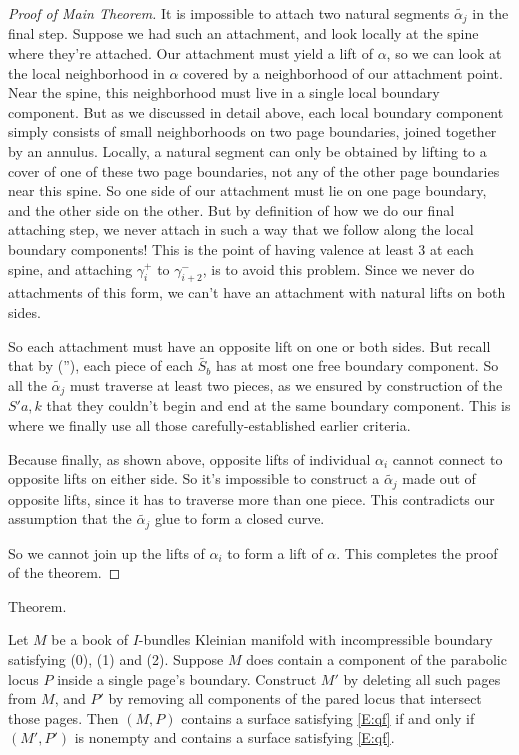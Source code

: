 \documentclass[12pt]{amsart}
\theoremstyle{definition}
\theoremstyle{remark}
\begin{document}
\begin{proof}[Proof of Main Theorem]
It is impossible to attach two natural segments $\widetilde{\alpha_j}$ in the final
step.  Suppose we had such an attachment, and look locally at the spine where
they're attached. Our attachment must yield a lift of $\alpha$, so we can look
at the local neighborhood in $\alpha$ covered by a neighborhood of our
attachment point.  Near the spine, this neighborhood must live in a single
local boundary component. But as we discussed in detail above, each local
boundary component simply consists of small neighborhoods on two page
boundaries, joined together by an annulus. Locally, a natural segment can only
be obtained by lifting to a cover of one of these two page boundaries, not any
of the other page boundaries near this spine. So one side of our attachment
must lie on one page boundary, and the other side on the other. But by
definition of how we do our final attaching step, we never attach in such a way
that we follow along the local boundary components! This is the point of having
valence at least 3 at each spine, and attaching $\gamma_i^+$ to
$\gamma_{i+2}^-$, is to avoid this problem. Since we never do attachments of
this form, we can't have an attachment with natural lifts on both sides.

So each attachment must have an opposite lift on one or both sides. But recall
that by (\dag''), each piece of each $\widetilde{S_b}$ has at most one free boundary
component. So all the $\widetilde{\alpha_j}$ must traverse at least two pieces, as we
ensured by construction of the $S'a,k$ that they couldn't begin and end at the
same boundary component. This is where we finally use all those
carefully-established earlier criteria.

Because finally, as shown above, opposite lifts of individual $\alpha_i$ cannot
connect to opposite lifts on either side. So it's impossible to construct
a $\widetilde{\alpha_j}$ made out of opposite lifts, since it has to traverse
more than one piece.  This contradicts our assumption that the
$\widetilde{\alpha_j}$ glue to form a closed curve.

So we cannot join up the lifts of $\alpha_i$ to form a lift of $\alpha$. This
completes the proof of the theorem.

\end{proof}


Theorem.


Let $M$ be a book of $I$-bundles Kleinian manifold with incompressible boundary
satisfying (0), (1) and (2). Suppose $M$ does contain a component of the
parabolic locus $P$ inside a single page's boundary. Construct $M'$ by deleting
all such pages from $M$, and $P'$ by removing all components of the pared locus
that intersect those pages. Then $(M,P)$ contains a surface satisfying \eqref{E:qf} if
and only if $(M',P')$ is nonempty and contains a surface satisfying \eqref{E:qf}.
\end{document}

